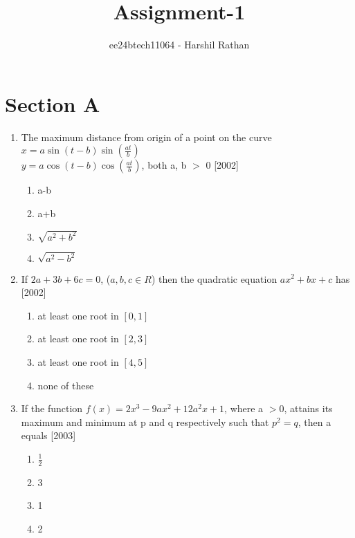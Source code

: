 \documentclass[journal,12pt,twocolumn]{IEEEtran}
\theoremstyle{remark}
\begin{document}

\vspace{3cm}

\title{Assignment-1}
\author{ee24btech11064 - Harshil Rathan}
\maketitle
\newpage
\bigskip

\renewcommand{\thefigure}{\theenumi}
\renewcommand{\thetable}{\theenumi}
\section{Section A}
\begin{enumerate}
\item The maximum distance from origin of a point on the curve\\ $x = a \sin(t-b) \sin(\frac{at}{b})$\\ $y = a \cos(t-b) \cos(\frac{at}{b})$, both a, b $>$ 0 \hfill{[2002]}
\begin{enumerate}
    \item a-b
        \item a+b
	    \item $\sqrt{a^2+b^2}$
	        \item $\sqrt{a^2-b^2}$  \\
		\end{enumerate}
		\item If $2a+3b+6c=0$, ($a,b,c \in R$) then the quadratic equation $ax^2+bx+c$ has \hfill{[2002]}
		\begin{enumerate}
		    \item at least one root in $[0,1]$
		        \item at  least one root in $[2,3]$
			    \item at least one root in $[4,5]$
			        \item none of these \\
				\end{enumerate}
				\item If the function $f(x)=2x^3-9ax^2+12a^2x+1$, where a $>$0, attains its maximum and minimum at p and q respectively such that $p
				    ^2=q$, then a equals  \hfill{[2003]}
				    \begin{enumerate}
				           \item $\frac{1}{2}$
					          \item 3
						         \item 1
							        \item 2

\end{enumerate}
\end{enumerate}
\end{document}
